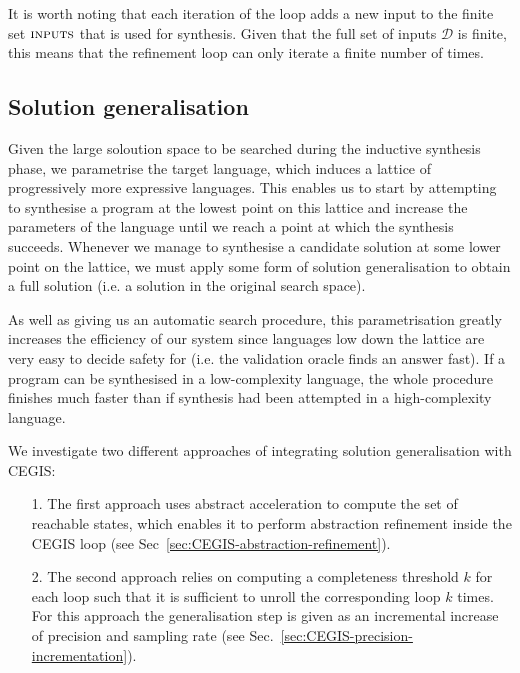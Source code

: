 \documentclass[runningheads,a4paper]{llncs}
\begin{document}
It is worth noting that each iteration of the loop adds a new input to
the finite set $\text{\sc inputs}$ that is used for synthesis.  Given
that the full set of inputs $\mathcal{D}$ is finite, this means that
the refinement loop can only iterate a finite number of times.

\subsection{Solution generalisation} 
Given the large soloution space to be searched during the inductive
synthesis phase, we parametrise the target language, which induces a
lattice of progressively more expressive languages.  This enables us
to start by attempting to synthesise a program at the lowest point on
this lattice and increase the parameters of the language until we
reach a point at which the synthesis succeeds. Whenever we manage to
synthesise a candidate solution at some lower point on the lattice, we
must apply some form of solution generalisation to obtain a full
solution (i.e. a solution in the original search space).

As well as giving us an automatic search procedure, this
parametrisation greatly increases the efficiency of our system since
languages low down the lattice are very easy to decide safety for
(i.e. the validation oracle finds an answer fast). If a program can be
synthesised in a low-complexity language, the whole procedure finishes
much faster than if synthesis had been attempted in a high-complexity
language.



We investigate two different approaches of integrating solution generalisation 
with CEGIS:
\begin{itemize}
\item[1.] The first approach uses abstract acceleration to compute the set of reachable states, which enables it to perform abstraction refinement inside the CEGIS loop (see Sec~\ref{sec:CEGIS-abstraction-refinement}). 
\item[2.] The second approach relies on computing a 
completeness threshold $k$ for each loop such that it is sufficient to 
unroll the corresponding loop $k$ times. For this approach the 
generalisation step is given as an incremental
increase of precision and sampling rate (see Sec.~\ref{sec:CEGIS-precision-incrementation}).
\end{itemize}

\end{document}
